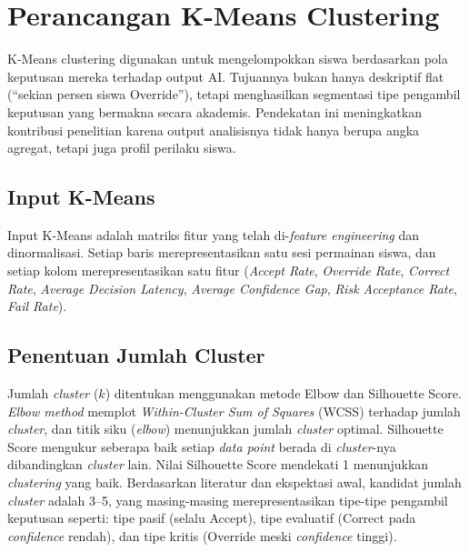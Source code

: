 \documentclass[10pt,twoside,openright]{report}
\begin{document}
\section{Perancangan K-Means Clustering}
\label{sec:perancangan-kmeans}

K-Means clustering digunakan untuk mengelompokkan siswa berdasarkan pola keputusan mereka terhadap output AI. Tujuannya bukan hanya deskriptif flat (``sekian persen siswa Override''), tetapi menghasilkan segmentasi tipe pengambil keputusan yang bermakna secara akademis. Pendekatan ini meningkatkan kontribusi penelitian karena output analisisnya tidak hanya berupa angka agregat, tetapi juga profil perilaku siswa.

\subsection{Input K-Means}

Input K-Means adalah matriks fitur yang telah di-\textit{feature engineering} dan dinormalisasi. Setiap baris merepresentasikan satu sesi permainan siswa, dan setiap kolom merepresentasikan satu fitur (\textit{Accept Rate}, \textit{Override Rate}, \textit{Correct Rate}, \textit{Average Decision Latency}, \textit{Average Confidence Gap}, \textit{Risk Acceptance Rate}, \textit{Fail Rate}).

\subsection{Penentuan Jumlah Cluster}

Jumlah \textit{cluster} ($k$) ditentukan menggunakan metode Elbow dan Silhouette Score. \textit{Elbow method} memplot \textit{Within-Cluster Sum of Squares} (WCSS) terhadap jumlah \textit{cluster}, dan titik siku (\textit{elbow}) menunjukkan jumlah \textit{cluster} optimal. Silhouette Score mengukur seberapa baik setiap \textit{data point} berada di \textit{cluster}-nya dibandingkan \textit{cluster} lain. Nilai Silhouette Score mendekati 1 menunjukkan \textit{clustering} yang baik. Berdasarkan literatur dan ekspektasi awal, kandidat jumlah \textit{cluster} adalah 3--5, yang masing-masing merepresentasikan tipe-tipe pengambil keputusan seperti: tipe pasif (selalu Accept), tipe evaluatif (Correct pada \textit{confidence} rendah), dan tipe kritis (Override meski \textit{confidence} tinggi).
\end{document}
